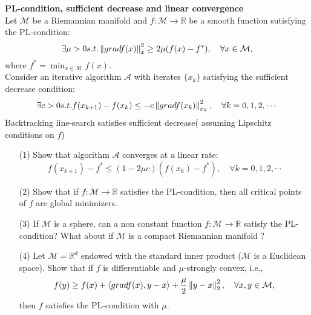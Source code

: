 \documentclass[en, oneside]{assignment}
\begin{document}
\begin{prob} \textbf{PL-condition, sufficient decrease and linear convergence}\\
    Let $\mathcal{M}$ be a Riemannian manifold and $f: \mathcal{M} \to \mathbb{R}$ be a smooth function sutisfying the PL-condition:
    \begin{equation*}
        \exists \mu > 0 s.t. \left\lVert gradf(x)\right\rVert _x ^2 \geq 2 \mu (f(x) - f ^*), \quad \forall x \in \mathcal{M},
    \end{equation*}
    where $f ^* = \min _{x \in \mathcal{M}} f(x)$.\\
    Consider an iterative algorithm $\mathcal{A}$ with iterates $\{x_k\}$ satisfying the sufficient decrease condition:
    \begin{equation*}
        \exists c > 0 s.t. f(x_{k+1}) - f(x_k) \leq -c \left\lVert gradf(x_k)\right\rVert _{x_k} ^2, \quad \forall k = 0, 1, 2, \cdots
    \end{equation*}
    Backtracking line-search satisfies sufficient decrease( assuming Lipschitz conditions on $f$)
    \begin{itemize}
        \item[(1)] Show that algorithm $\mathcal{A}$ converges at a linear rate:
        \begin{equation*}
            f(x_{k+1}) - f ^* \leq (1 - 2 \mu c) (f(x_k) - f ^*), \quad \forall k = 0, 1, 2, \cdots
        \end{equation*}
        \item[(2)] Show that if $f: \mathcal{M} \to \mathbb{R}$ satisfies the PL-condition, then all critical points of $f$ are global minimizers.
        \item[(3)] If $\mathcal{M}$ is a sphere, can a non constant function $f: \mathcal{M} \to \mathbb{R}$ satisfy the PL-condition? 
        What about if $\mathcal{M}$ is a compact Riemannian manifold ?
        \item[(4)] Let $\mathcal{M} = \mathbb{R} ^d$ endowed with the standard inner product ($\mathcal{M}$ is a Euclidean space). 
        Show that if $f$ is differentiable and $\mu$-strongly convex, i.e.,
        \begin{equation*}
            f(y) \geq f(x) + \left\langle gradf(x), y - x \right\rangle + \frac{\mu}{2} \left\lVert y - x\right\rVert _2 ^2, \quad \forall x, y \in \mathcal{M},
        \end{equation*}
        then $f$ satisfies the PL-condition with $\mu$.

    \end{itemize}
\end{prob}
\end{document}
